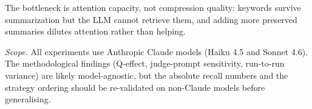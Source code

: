 The bottleneck is attention capacity, not compression quality: keywords
survive summarization but the LLM cannot retrieve them, and adding more
preserved summaries dilutes attention rather than helping.

\textit{Scope.} All experiments use Anthropic Claude models (Haiku 4.5 and
Sonnet 4.6). The methodological findings (Q-effect, judge-prompt
sensitivity, run-to-run variance) are likely model-agnostic, but the
absolute recall numbers and the strategy ordering should be re-validated
on non-Claude models before generalising.
